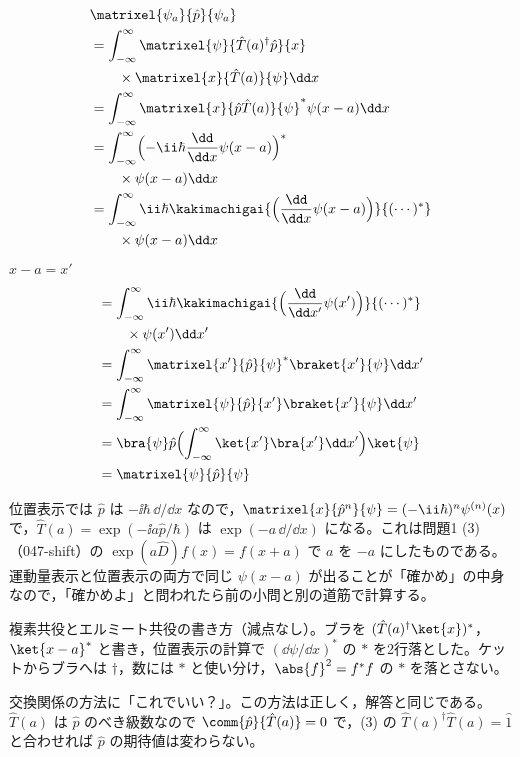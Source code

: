 \begin{align*}
&\matrixel{\psi_{a}}{\hat{p}}{\psi_{a}}\\
&=\int_{-\infty}^{\infty}\matrixel{\psi}{\hat{T}(a)^{\dagger}\hat{p}}{x}\\
&\qquad\times\matrixel{x}{\hat{T}(a)}{\psi}\dd x\\
&=\int_{-\infty}^{\infty}\matrixel{x}{\hat{p}\hat{T}(a)}{\psi}^{*}\psi(x-a)\dd x\\
&=\int_{-\infty}^{\infty}\Bigl(-\ii\hbar\frac{\dd}{\dd x}\psi(x-a)\Bigr)^{*}\\
&\qquad\times\psi(x-a)\dd x\\
&=\int_{-\infty}^{\infty}\ii\hbar\kakimachigai{\Bigl(\frac{\dd}{\dd x}\psi(x-a)\Bigr)}{(\cdots)^{*}}\\
&\qquad\times\psi(x-a)\dd x
\end{align*}
$x-a=x'$
\begin{align*}
&=\int_{-\infty}^{\infty}\ii\hbar\kakimachigai{\Bigl(\frac{\dd}{\dd x'}\psi(x')\Bigr)}{(\cdots)^{*}}\\
&\qquad\times\psi(x')\dd x'\\
&=\int_{-\infty}^{\infty}\matrixel{x'}{\hat{p}}{\psi}^{*}\braket{x'}{\psi}\dd x'\\
&=\int_{-\infty}^{\infty}\matrixel{\psi}{\hat{p}}{x'}\braket{x'}{\psi}\dd x'\\
&=\bra{\psi}\hat{p}\Bigl(\int_{-\infty}^{\infty}\ket{x'}\bra{x'}\dd x'\Bigr)\ket{\psi}\\
&=\matrixel{\psi}{\hat{p}}{\psi}
\end{align*}
\item 位置表示では $\hat{p}$ は $-\ii\hbar\,\dd/\dd x$ なので，$\matrixel{x}{\hat{p}^{n}}{\psi}=(-\ii\hbar)^{n}\psi^{(n)}(x)$ で，$\hat{T}(a)=\exp(-\ii a\hat{p}/\hbar)$ は $\exp(-a\,\dd/\dd x)$ になる。これは問題1 (3)（047-shift）の $\exp(a\hat{D})f(x)=f(x+a)$ で $a$ を $-a$ にしたものである。運動量表示と位置表示の両方で同じ $\psi(x-a)$ が出ることが「確かめ」の中身なので，「確かめよ」と問われたら前の小問と別の道筋で計算する。
\item {} 複素共役とエルミート共役の書き方（減点なし）。ブラを $(\hat{T}(a)^{\dagger}\ket{x})^{*}$，$\ket{x-a}^{*}$ と書き，位置表示の計算で $(\dd\psi/\dd x)^{*}$ の $*$ を2行落とした。ケットからブラへは $\dagger$，数には $*$ と使い分け，$\abs{f}^{2}=f^{*}f$ の $*$ を落とさない。
\item \jibunmemo 交換関係の方法に「これでいい？」。この方法は正しく，解答と同じである。$\hat{T}(a)$ は $\hat{p}$ のべき級数なので $\comm{\hat{p}}{\hat{T}(a)}=0$ で，(3) の $\hat{T}(a)^{\dagger}\hat{T}(a)=\hat{1}$ と合わせれば $\hat{p}$ の期待値は変わらない。
